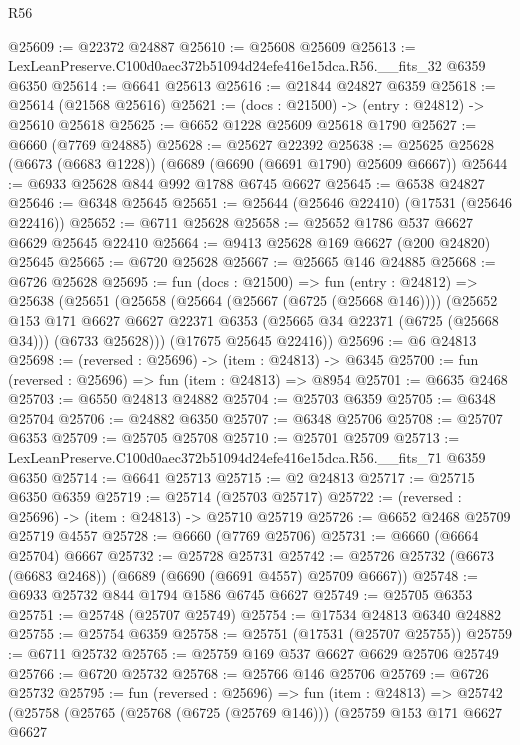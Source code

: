 \begin{lexlean}{R56}
\begin{coremodule}
@25609 := @22372 @24887
@25610 := @25608 @25609
@25613 := LexLeanPreserve.C100d0aec372b51094d24efe416e15dca.R56.__fits_32 @6359 @6350
@25614 := @6641 @25613
@25616 := @21844 @24827 @6359
@25618 := @25614 (@21568 @25616)
@25621 := (docs : @21500) -> (entry : @24812) -> @25610 @25618
@25625 := @6652 @1228 @25609 @25618 @1790
@25627 := @6660 (@7769 @24885)
@25628 := @25627 @22392
@25638 := @25625 @25628 (@6673 (@6683 @1228)) (@6689 (@6690 (@6691 @1790) @25609 @6667))
@25644 := @6933 @25628 @844 @992 @1788 @6745 @6627
@25645 := @6538 @24827
@25646 := @6348 @25645
@25651 := @25644 (@25646 @22410) (@17531 (@25646 @22416))
@25652 := @6711 @25628
@25658 := @25652 @1786 @537 @6627 @6629 @25645 @22410
@25664 := @9413 @25628 @169 @6627 (@200 @24820) @25645
@25665 := @6720 @25628
@25667 := @25665 @146 @24885
@25668 := @6726 @25628
@25695 := fun (docs : @21500) =>
  fun (entry : @24812) =>
  @25638
    (@25651
      (@25658
        (@25664 (@25667 (@6725 (@25668 @146))))
        (@25652
          @153
          @171
          @6627
          @6627
          @22371
          @6353
          (@25665 @34 @22371 (@6725 (@25668 @34)))
          (@6733 @25628)))
      (@17675 @25645 @22416))
@25696 := @6 @24813
@25698 := (reversed : @25696) -> (item : @24813) -> @6345
@25700 := fun (reversed : @25696) => fun (item : @24813) => @8954
@25701 := @6635 @2468
@25703 := @6550 @24813 @24882
@25704 := @25703 @6359
@25705 := @6348 @25704
@25706 := @24882 @6350
@25707 := @6348 @25706
@25708 := @25707 @6353
@25709 := @25705 @25708
@25710 := @25701 @25709
@25713 := LexLeanPreserve.C100d0aec372b51094d24efe416e15dca.R56.__fits_71 @6359 @6350
@25714 := @6641 @25713
@25715 := @2 @24813
@25717 := @25715 @6350 @6359
@25719 := @25714 (@25703 @25717)
@25722 := (reversed : @25696) -> (item : @24813) -> @25710 @25719
@25726 := @6652 @2468 @25709 @25719 @4557
@25728 := @6660 (@7769 @25706)
@25731 := @6660 (@6664 @25704) @6667
@25732 := @25728 @25731
@25742 := @25726 @25732 (@6673 (@6683 @2468)) (@6689 (@6690 (@6691 @4557) @25709 @6667))
@25748 := @6933 @25732 @844 @1794 @1586 @6745 @6627
@25749 := @25705 @6353
@25751 := @25748 (@25707 @25749)
@25754 := @17534 @24813 @6340 @24882
@25755 := @25754 @6359
@25758 := @25751 (@17531 (@25707 @25755))
@25759 := @6711 @25732
@25765 := @25759 @169 @537 @6627 @6629 @25706 @25749
@25766 := @6720 @25732
@25768 := @25766 @146 @25706
@25769 := @6726 @25732
@25795 := fun (reversed : @25696) =>
  fun (item : @24813) =>
  @25742
    (@25758
      (@25765
        (@25768 (@6725 (@25769 @146)))
        (@25759
          @153
          @171
          @6627
          @6627

\end{coremodule}
\end{lexlean}

